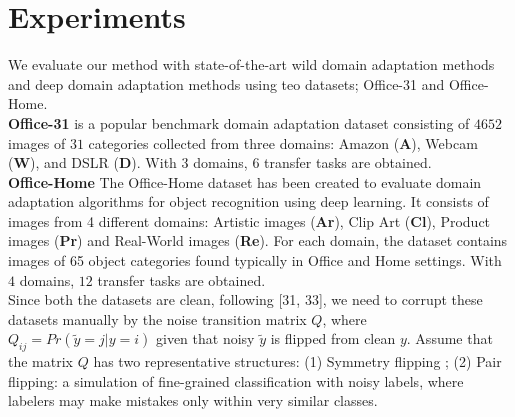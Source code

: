 \section{Experiments}
We evaluate our method with state-of-the-art wild domain adaptation methods and deep domain adaptation methods using teo datasets; Office-31 and Office-Home.\\

\textbf{Office-31} \cite{office} is a popular benchmark domain adaptation dataset consisting of $4652$ images of $31$ categories collected from three domains: Amazon (\textbf{A}), Webcam (\textbf{W}), and DSLR (\textbf{D}). With $3$ domains, $6$ transfer tasks are obtained.\\

\textbf{Office-Home} The Office-Home dataset has been created to evaluate domain adaptation algorithms for object recognition using deep learning. It consists of images from 4 different domains: Artistic images (\textbf{Ar}), Clip Art (\textbf{Cl}), Product images (\textbf{Pr}) and Real-World images (\textbf{Re}). For each domain, the dataset contains images of 65 object categories found typically in Office and Home settings. With $4$ domains, $12$ transfer tasks are obtained.\\

Since both the datasets are clean, following [31, 33], we need to corrupt these datasets manually by the noise transition matrix $Q$, where $Q_{ij} = Pr(\tilde{y} = j|y = i)$ given that noisy $\tilde{y}$ is flipped from clean $y$. Assume that the matrix $Q$ has two representative structures: (1) Symmetry flipping \cite{10.5555/2969239.2969241};
(2) Pair flipping: a simulation of fine-grained classification with noisy labels, where labelers may make mistakes only within very similar classes.
\newpage

